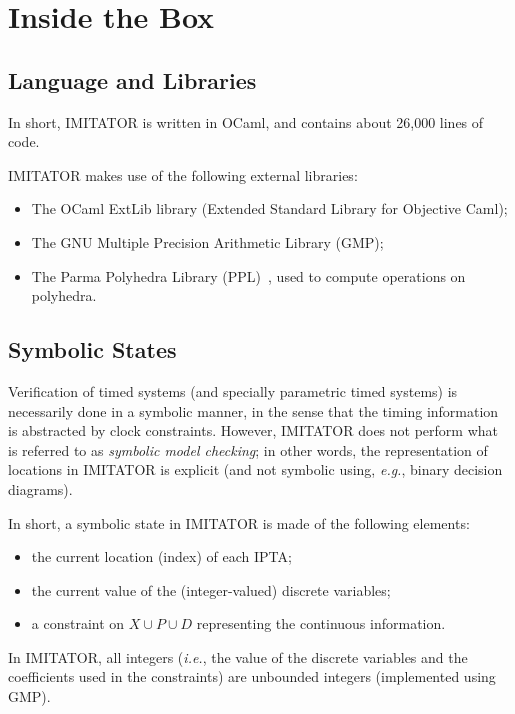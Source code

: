 \documentclass[a4paper,11pt]{report}
\newcommand{\Clock}{X} %
\newcommand{\DVar}{D} %
\newcommand{\Param}{P} %
\newcommand{\imitator}{\textsf{IMITATOR}}
\newcommand{\IPTA}{IPTA}
\newcommand{\ocaml}{OCaml}
\newcommand{\eg}{\textcolor{colorok}{\textit{e.g.}, }}
\newcommand{\ie}{\textcolor{colorok}{\textit{i.e.}, }}
\begin{document}
\chapter{Inside the Box}


\section{Language and Libraries}

In short, \imitator{} is written in \ocaml{}, and contains about 26,000 lines of code.

\imitator{} makes use of the following external libraries:

\begin{itemize}
	\item The OCaml ExtLib library (Extended Standard Library for Objective Caml);
	\item The GNU Multiple Precision Arithmetic Library (GMP);
	\item The Parma Polyhedra Library (PPL)~\cite{bhz08}, used to compute operations on polyhedra.
\end{itemize}


\section{Symbolic States}

Verification of timed systems (and specially parametric timed systems) is necessarily done in a symbolic manner, in the sense that the timing information is abstracted by clock constraints.
However, \imitator{} does not perform what is referred to as \emph{symbolic model checking}; in other words, the representation of locations in \imitator{} is explicit (and not symbolic using, \eg{} binary decision diagrams).

In short, a symbolic state in \imitator{} is made of the following elements:
\begin{itemize}
	\item the current location (index) of each \IPTA{};
	\item the current value of the (integer-valued) discrete variables;
	\item a constraint on $\Clock \cup \Param \cup \DVar$ representing the continuous information.
\end{itemize}
In \imitator{}, all integers (\ie{} the value of the discrete variables and the coefficients used in the constraints) are unbounded integers (implemented using GMP).
\end{document}
